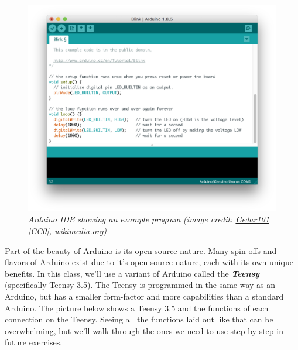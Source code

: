 \documentclass[]{book}
\begin{document}
\begin{figure}
\centering
\includegraphics{images/Arduino_IDE_-_Blink.png}
\caption{\emph{Arduino IDE showing an example program (image credit: \href{https://commons.wikimedia.org/wiki/File:Arduino_IDE_-_Blink.png}{Cedar101 {[}CC0{]}, wikimedia.org})}}
\end{figure}

Part of the beauty of Arduino is its open-source nature. Many spin-offs and flavors of Arduino exist due to it's open-source nature, each with its own unique benefits. In this class, we'll use a variant of Arduino called the \textbf{\emph{Teensy}} (specifically Teensy 3.5). The Teensy is programmed in the same way as an Arduino, but has a smaller form-factor and more capabilities than a standard Arduino. The picture below shows a Teensy 3.5 and the functions of each connection on the Teensy. Seeing all the functions laid out like that can be overwhelming, but we'll walk through the ones we need to use step-by-step in future exercises.
\end{document}
